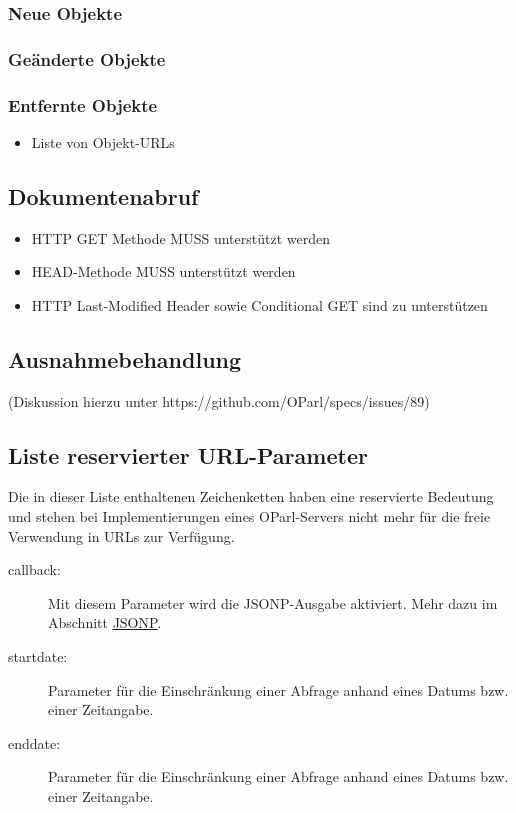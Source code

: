 \documentclass[,a4paper]{article}
\begin{document}
\subsubsection{Neue Objekte}

\subsubsection{Geänderte Objekte}

\subsubsection{Entfernte Objekte}

\begin{itemize}
\item
  Liste von Objekt-URLs
\end{itemize}

\subsection{Dokumentenabruf}

\begin{itemize}
\item
  HTTP GET Methode MUSS unterstützt werden
\item
  HEAD-Methode MUSS unterstützt werden
\item
  HTTP Last-Modified Header sowie Conditional GET sind zu unterstützen
\end{itemize}

\subsection{Ausnahmebehandlung}

(Diskussion hierzu unter https://github.com/OParl/specs/issues/89)

\subsection{Liste reservierter URL-Parameter}

Die in dieser Liste enthaltenen Zeichenketten haben eine reservierte
Bedeutung und stehen bei Implementierungen eines OParl-Servers nicht
mehr für die freie Verwendung in URLs zur Verfügung.

\begin{description}
\item[callback:]
Mit diesem Parameter wird die JSONP-Ausgabe aktiviert. Mehr dazu im
Abschnitt \hyperref[jsonp]{JSONP}.
\item[startdate:]
Parameter für die Einschränkung einer Abfrage anhand eines Datums bzw.
einer Zeitangabe.
\item[enddate:]
Parameter für die Einschränkung einer Abfrage anhand eines Datums bzw.
einer Zeitangabe.
\end{description}
\end{document}
